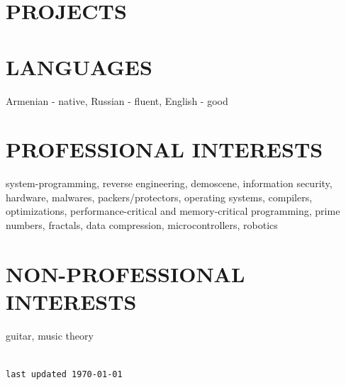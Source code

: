 \documentclass[10pt]{res}
\begin{document}
\begin{resume}
\section{PROJECTS}

\section{LANGUAGES}
	Armenian - native, Russian - fluent, English - good
	 
\section{PROFESSIONAL INTERESTS}
system-programming, reverse engineering, demoscene, information security, hardware, malwares, packers/protectors, operating systems, compilers, 
optimizations, performance-critical and memory-critical programming, 
prime numbers, fractals, data compression, microcontrollers, robotics
 \\
\section{NON-PROFESSIONAL INTERESTS}
guitar, music theory
 \\
 \\
\begin{flushright}
\vfill \scriptsize \texttt{last updated \today}
\end{flushright}

\end{resume}
\end{document}

